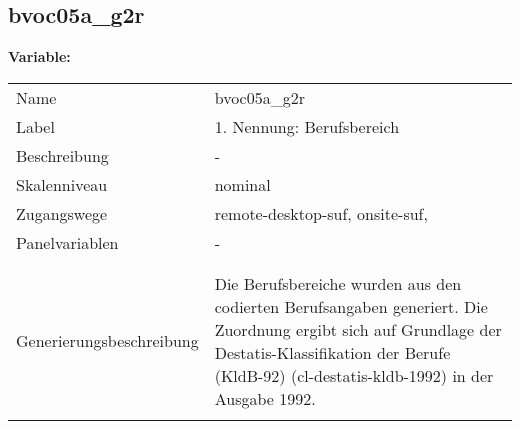 	
	
	\subsection{bvoc05a\_g2r}
	\label{subSection:bvoc05a_g2r}

	\noindent\textbf{Variable:}\\
		\begin{tabular}{lL{11.3cm}}
			\label{tableVariable:bvoc05a_g2r}
			Name & bvoc05a\_g2r \\
			Label & 1. Nennung: Berufsbereich \\
			Beschreibung & - \\
			Skalenniveau & nominal \\
			Zugangswege &
				remote-desktop-suf,
				onsite-suf,
 \\
			Panelvariablen & -
			 \\
			 \\
 \\
					Generierungsbeschreibung & Die Berufsbereiche wurden aus den codierten Berufsangaben generiert. Die Zuordnung ergibt sich auf Grundlage der Destatis-Klassifikation der Berufe (KldB-92) (cl-destatis-kldb-1992) in der Ausgabe 1992. 
				 \\	
			 \\
		\end{tabular}






